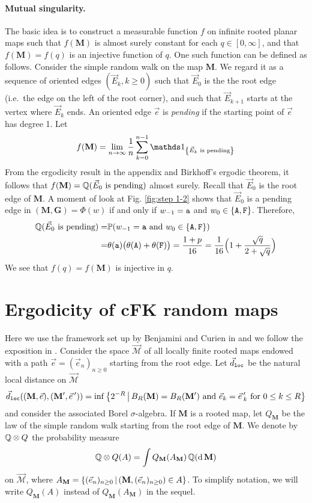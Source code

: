 \documentclass[a4paper]{article}
\newcommand*{\bpar}[1]{\big(#1\big)}
\newcommand*{\Bpar}[1]{\Big(#1\Big)}
\newcommand*{\map}{\mathbf}
\newcommand*{\M}{\mathcal{M}}
\newcommand*{\m}{\map{M}}
\newcommand*{\QM}{Q_{\map{M}}}
\newcommand*{\QQ}{\proba[Q]\otimes Q}
\newcommand*{\ve}[1][e]{\vec{#1}}
\newcommand*{\ven}[1][]{(\vec{e}_{n#1})_{n\ge 0}}
\begin{document}
\paragraph{Mutual singularity.}
The basic idea is to construct a measurable function $f$ on infinite rooted planar maps such that $f(\m )$ is almost surely constant for each $q\in[0,\infty]$, and that $f(\m ) = f(q)$ is an injective function of $q$.
One such function can be defined as follows.
Consider the simple random walk on the map $\m $.
We regard it as a sequence of oriented edges $(\ve[E]_k,k\ge 0)$ such that $\ve[E]_0$ is the the root edge (i.e.\ the edge on the left of the root corner), and such that $\ve[E]_{k+1}$ starts at the vertex where $\ve[E]_k$ ends.
An oriented edge $\ve$ is \emph{pending} if the starting point of $\ve$ has degree 1.
Let
$$ f(\m ) = \lim_{n\to\infty} \frac{1}{n}\sum_{k=0}^{n-1} \idd{\ve[E]_k \text{ is pending}} $$
From the ergodicity result in the appendix and Birkhoff's ergodic theorem, it follows that $f(\m )=\proba[Q](\ve[E]_0 \text{ is pending})$ almost surely.
Recall that $\ve[E]_0$ is the root edge of $\m $.
A moment of look at Fig. \ref{fig:step 1-2} shows that $\ve[E]_0$ is a pending edge in $(\m,\map{G})=\Phi(w)$ if and only if $w_{-1}=\mathtt{a}$ and $w_0\in\{\mathtt{A},\mathtt{F}\}$.
Therefore,
\begin{align*}
	\proba[Q](\ve[E]_0 \text{ is pending})
=&	\proba(w_{-1}=\xa\text{ and }w_0\in\{\xA,\xF\})
\\=&\theta(\xa)\bpar{ \theta(\xA)+\theta(\xF) } = \frac{1+p}{16}
=	\frac{1}{16} \Bpar{ 1+\frac{\sqrt{q}}{2+\sqrt{q}} }
\end{align*}
We see that $f(q)=f(\m )$ is injective in $q$.


\appendix
\section{Ergodicity of cFK random maps}\label{appendix}
Here we use the framework set up by Benjamini and Curien in \cite{BC12} and we follow the exposition in \cite[Sec 3.1]{PSHIT}.
Consider the space $\overrightarrow{\M}$ of all locally finite rooted maps endowed with a path $\ve = \ven$ starting from the root edge.
Let $\vec{d}_{\mathtt{loc}}$ be the natural local distance on $\overrightarrow{\M}$
$$ \vec{d}\sub{loc}((\m,\ve),(\m',\ve\,')) = 
	\inf\set{2^{-R}}{B_R(\m)=B_R(\m')
					\text{ and } \ve_k=\ve\,'_k\text{ for }0\le k\le R}
$$
and consider the associated Borel $\sigma$-algebra.
If $\m $ is a rooted map, let $\QM$ be the law of the simple random walk starting from the root edge of $\m $.
We denote by $\QQ$ the probability measure
$$
	\QQ(A) = \int \QM(A_\m)\, \proba[Q](\dd \m)
$$
on $\overrightarrow{\M}$, where $A_\m  = \set{ \ven }{ (\m,\ven)\in A}$.
To simplify notation, we will write $\QM(A)$ instead of $\QM(A_\m )$ in the sequel.
\end{document}
